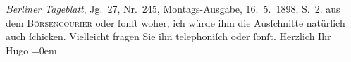\begin{ledgroupsized}[t]{13cm}
{{{                        \emph{Berliner Tageblatt}, Jg. 27, Nr. 245,
                     Montags-Ausgabe, 16. 5. 1898, S. 2.}}}\label{K_L00796_3h} aus dem \textsc{Börsencourier} oder ſonſt woher, ich würde ihm die Ausſchnitte natürlich auch ſchicken.
               Vielleicht fragen Sie ihn telephoniſch oder ſonſt.\pend
           \pstart
           Herzlich Ihr{\\[\baselineskip]}\spacefill\mbox{Hugo}\pend
           \leftskip=0em{}
         
         \endnumbering{}\end{ledgroupsized}  \newcommand{\dateiname}{L00796}\newcommand{\titel}{Hugo von Hofmannsthal an Arthur Schnitzler, [18. 5. 1898]}\newcommand{\editorInnen}{Martin Anton Müller und Gerd-Hermann Susen}
      